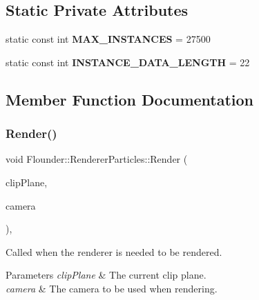 \subsection*{Static Private Attributes}
\begin{DoxyCompactItemize}
\item 
\mbox{\label{class_flounder_1_1_renderer_particles_a75cae07b374fe318a65f9030ceacfc59}} 
static const int {\bfseries M\+A\+X\+\_\+\+I\+N\+S\+T\+A\+N\+C\+ES} = 27500
\item 
\mbox{\label{class_flounder_1_1_renderer_particles_a4cc6d39f086cc5c50234d886a4bf8e55}} 
static const int {\bfseries I\+N\+S\+T\+A\+N\+C\+E\+\_\+\+D\+A\+T\+A\+\_\+\+L\+E\+N\+G\+TH} = 22
\end{DoxyCompactItemize}


\subsection{Member Function Documentation}
\mbox{\label{class_flounder_1_1_renderer_particles_a6ea635663814d5edea980422674fc107}} 
\subsubsection{\texorpdfstring{Render()}{Render()}}
{\footnotesize\ttfamily void Flounder\+::\+Renderer\+Particles\+::\+Render (\begin{DoxyParamCaption}\item[{const \hyperlink{class_flounder_1_1_vector4}{Vector4} \&}]{clip\+Plane,  }\item[{const \hyperlink{class_flounder_1_1_i_camera}{I\+Camera} \&}]{camera }\end{DoxyParamCaption})\hspace{0.3cm}{\ttfamily [override]}, {\ttfamily [virtual]}}



Called when the renderer is needed to be rendered. 


\begin{DoxyParams}{Parameters}
{\em clip\+Plane} & The current clip plane. \\
\hline
{\em camera} & The camera to be used when rendering. \\
\hline
\end{DoxyParams}


